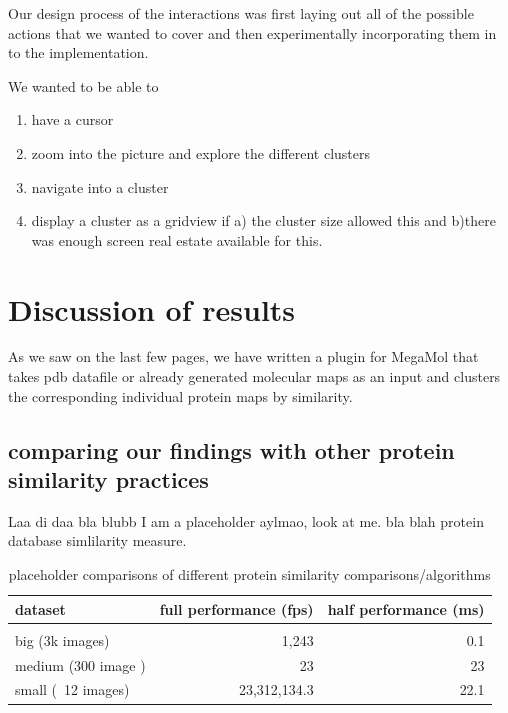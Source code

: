 \documentclass[journal]{vgtc}       %
\begin{document}
Our design process of the interactions was first  laying out all of the possible actions that we wanted to cover and then experimentally incorporating them in to the implementation.

We wanted to be able to 
\begin{enumerate}
  \item have a cursor 
  \item zoom into the picture and  explore the different clusters
  \item navigate into a cluster
  \item display a cluster as a gridview if a) the cluster size allowed this and b)there was enough screen real estate available for this.
  
\end{enumerate}



\section{Discussion of results}
As we saw on the last few pages, we have written a plugin for MegaMol that takes pdb datafile or already generated molecular maps as an input and clusters  the corresponding individual protein maps by similarity.

\subsection{comparing our findings with other protein similarity practices}\label{subsec:comparison}
Laa di daa bla blubb I am a placeholder aylmao, look at me. bla \cite{3dsurfer} blah protein database simlilarity measure.


\begin{table}
  \caption{
  \label{tab:perf} placeholder comparisons of different protein similarity comparisons/algorithms}
  \centering
  \vspace{0.3em}
  \begin{tabular}{lrr}
  dataset & full performance (fps) & half performance (ms)\\ \hline\\[-0.4em]
  big (3k images) & 1,243 & 0.1 \\
  medium (300 image ) & 23 & 23 \\
  small (~12 images) & 23,312,134.3 & 22.1 \\
  \end{tabular}
  \end{table}
\end{document}
